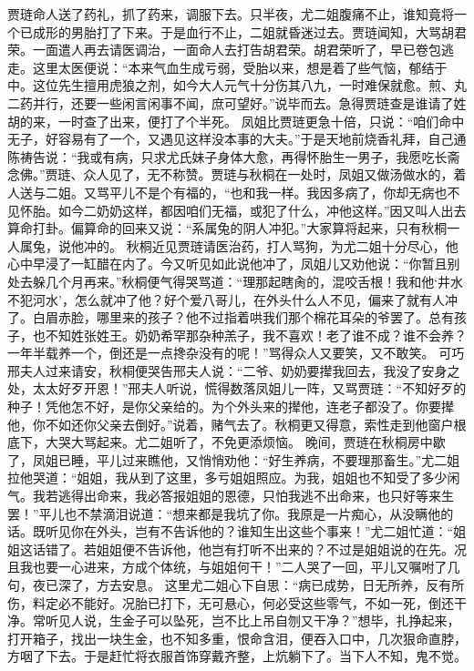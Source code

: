 \documentclass[12pt,oneside]{book}
\begin{document}
贾琏命人送了药礼，抓了药来，调服下去。只半夜，尤二姐腹痛不止，谁知竟将一个已成形的男胎打了下来。于是血行不止，二姐就昏迷过去。贾琏闻知，大骂胡君荣。一面遣人再去请医调治，一面命人去打告胡君荣。胡君荣听了，早已卷包逃走。这里太医便说：“本来气血生成亏弱，受胎以来，想是着了些气恼，郁结于中。这位先生擅用虎狼之剂，如今大人元气十分伤其八九，一时难保就愈。煎、丸二药并行，还要一些闲言闲事不闻，庶可望好。”说毕而去。急得贾琏查是谁请了姓胡的来，一时查了出来，便打了个半死。
凤姐比贾琏更急十倍，只说：“咱们命中无子，好容易有了一个，又遇见这样没本事的大夫。”于是天地前烧香礼拜，自己通陈祷告说：“我或有病，只求尤氏妹子身体大愈，再得怀胎生一男子，我愿吃长斋念佛。”贾琏、众人见了，无不称赞。贾琏与秋桐在一处时，凤姐又做汤做水的，着人送与二姐。又骂平儿不是个有福的，“也和我一样。我因多病了，你却无病也不见怀胎。如今二奶奶这样，都因咱们无福，或犯了什么，冲他这样。”因又叫人出去算命打卦。偏算命的回来又说：“系属兔的阴人冲犯。”大家算将起来，只有秋桐一人属兔，说他冲的。
秋桐近见贾琏请医治药，打人骂狗，为尤二姐十分尽心，他心中早浸了一缸醋在内了。今又听见如此说他冲了，凤姐儿又劝他说：“你暂且别处去躲几个月再来。”秋桐便气得哭骂道：“理那起瞎肏的，混咬舌根！我和他‘井水不犯河水’，怎么就冲了他？好个爱八哥儿，在外头什么人不见，偏来了就有人冲了。白眉赤脸，哪里来的孩子？他不过指着哄我们那个棉花耳朵的爷罢了。总有孩子，也不知姓张姓王。奶奶希罕那杂种羔子，我不喜欢！老了谁不成？谁不会养？一年半载养一个，倒还是一点搀杂没有的呢！”骂得众人又要笑，又不敢笑。
可巧邢夫人过来请安，秋桐便哭告邢夫人说：“二爷、奶奶要撵我回去，我没了安身之处，太太好歹开恩！”邢夫人听说，慌得数落凤姐儿一阵，又骂贾琏：“不知好歹的种子！凭他怎不好，是你父亲给的。为个外头来的撵他，连老子都没了。你要撵他，你不如还你父亲去倒好。”说着，赌气去了。秋桐更又得意，索性走到他窗户根底下，大哭大骂起来。尤二姐听了，不免更添烦恼。
晚间，贾琏在秋桐房中歇了，凤姐已睡，平儿过来瞧他，又悄悄劝他：“好生养病，不要理那畜生。”尤二姐拉他哭道：“姐姐，我从到了这里，多亏姐姐照应。为我，姐姐也不知受了多少闲气。我若逃得出命来，我必答报姐姐的恩德，只怕我逃不出命来，也只好等来生罢！”平儿也不禁滴泪说道：“想来都是我坑了你。我原是一片痴心，从没瞒他的话。既听见你在外头，岂有不告诉他的？谁知生出这些个事来！”尤二姐忙道：“姐姐这话错了。若姐姐便不告诉他，他岂有打听不出来的？不过是姐姐说的在先。况且我也要一心进来，方成个体统，与姐姐何干！”二人哭了一回，平儿又嘱咐了几句，夜已深了，方去安息。
这里尤二姐心下自思：“病已成势，日无所养，反有所伤，料定必不能好。况胎已打下，无可悬心，何必受这些零气，不如一死，倒还干净。常听见人说，生金子可以坠死，岂不比上吊自刎又干净？”想毕，扎挣起来，打开箱子，找出一块生金，也不知多重，恨命含泪，便吞入口中，几次狠命直脖，方咽了下去。于是赶忙将衣服首饰穿戴齐整，上炕躺下了。当下人不知，鬼不觉。
\end{document}

